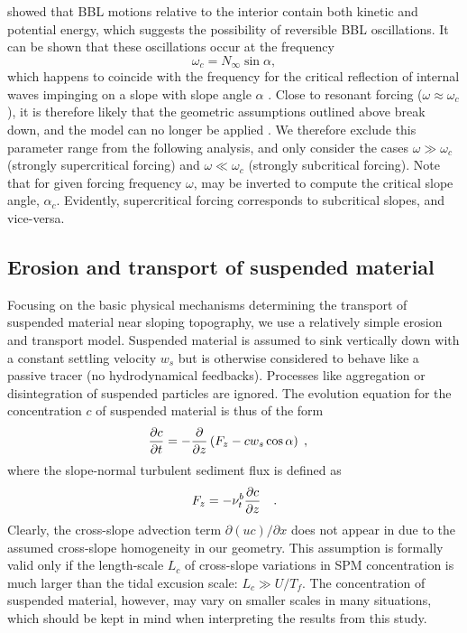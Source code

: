 \cite{UmlaufBurchard2011a} showed that BBL motions relative to the
interior contain both kinetic and potential energy, which suggests the
possibility of reversible BBL oscillations. It can be shown that these
oscillations occur at the frequency
\begin{equation}
  \label{omegac}
  \omega_c = N_\infty \sin \alpha
  \comma
\end{equation}
which happens to coincide with the frequency for the critical
reflection of internal waves impinging on a slope with slope angle
$\alpha$ \citep[see][]{Thorpe2005a}. Close to resonant forcing
($\omega \approx \omega_c$), it is therefore likely that the geometric
assumptions outlined above break down, and the model can no longer be
applied \citep{UmlaufBurchard2011a}. We therefore exclude this parameter 
range from the following analysis, and only consider the cases
$\omega \gg \omega_c$ (strongly supercritical forcing) and $\omega \ll
\omega_c$ (strongly subcritical forcing). Note that for given forcing
frequency $\omega$,  may be inverted to compute the
critical slope angle, $\alpha_c$. Evidently, supercritical forcing
corresponds to subcritical slopes, and vice-versa.


\subsection{Erosion and transport of suspended material}

Focusing on the basic physical mechanisms determining the
transport of suspended material near sloping topography, we use a
relatively simple erosion and transport model. Suspended material is
assumed to sink vertically down with a constant settling velocity
$w_s$ but is otherwise considered to behave like a passive tracer (no
hydrodynamical feedbacks). Processes like aggregation or
disintegration of suspended particles are ignored. The evolution
equation for the concentration $c$ of suspended material is thus of
the form
\begin{equation}
  \label{c}
     \dfrac{\partial {c}}{\partial {t}} 
     = - \dfrac{\partial {}}{\partial {z}}\left( F_z -  c w_s \cos \alpha \right) 
     \; , \quad
\end{equation}
where the slope-normal turbulent sediment flux is defined as
\begin{equation}
  \label{Fz}
  F_z = -\nu_t^b \dfrac{\partial {c}}{\partial {z}}
  \quad .
\end{equation}
Clearly, the cross-slope advection term $\partial (uc) / \partial x$
does not appear in  due to the assumed cross-slope homogeneity
in our geometry. This assumption is formally valid only if the
length-scale $L_c$ of cross-slope variations in SPM concentration is
much larger than the tidal excusion scale: $L_c \gg U/T_f$. The
concentration of suspended material, however, may vary on smaller
scales in many situations, which should be kept in mind when
interpreting the results from this study.

